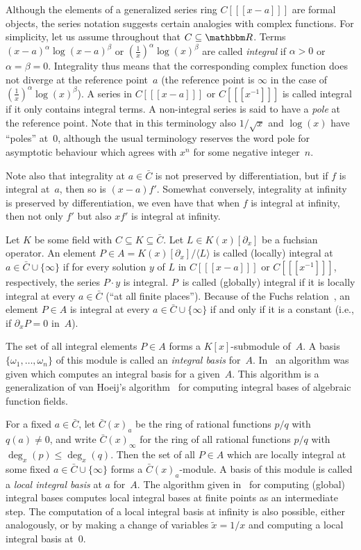 \documentclass{sig-alternate}
\def\<#1>{\langle#1\rangle}
\let\set\mathbbm
\begin{document}
Although the elements of a generalized series ring $C[[[x-a]]]$ are formal
objects, the series notation suggests certain analogies with complex
functions.  For simplicity, let us assume throughout that $C\subseteq\set
R$. Terms $(x-a)^\alpha\log(x-a)^\beta$ or $(\tfrac1x)^\alpha\log(x)^\beta$ are
called \emph{integral} if $\alpha>0$ or $\alpha=\beta=0$.
Integrality thus means that the corresponding complex
function does not diverge at the reference point~$a$ (the reference point is
$\infty$ in the case of $(\tfrac1x)^\alpha\log(x)^\beta$). A series in
$C[[[x-a]]]$ or $C[[[x^{-1}]]]$ is called integral if it only contains integral
terms. A non-integral series is said to have a \emph{pole} at the reference
point.  Note that in this terminology also $1/\sqrt{x}$ and $\log(x)$ have
``poles'' at~$0$, although the usual terminology reserves the word pole for
asymptotic behaviour which agrees with $x^n$ for some negative integer~$n$.

Note also that integrality at $a\in\bar C$ is not preserved by differentiation,
but if $f$ is integral at~$a$, then so is $(x-a)f'$. Somewhat conversely,
integrality at infinity is preserved by differentiation, we even have that
when $f$ is integral at infinity, then not only $f'$ but also $xf'$ is
integral at infinity. 

Let $K$ be some field with $C\subseteq K\subseteq\bar C$. 
Let $L\in K(x)[\partial_x]$ be a fuchsian operator. An element $P\in A=K(x)[\partial_x]/\<L>$
is called (locally) integral at $a\in\bar C\cup\{\infty\}$ if for every solution $y$
of $L$ in $C[[[x-a]]]$ or $C[[[x^{-1}]]]$, respectively, the series $P\cdot y$ is
integral. $P$~is called (globally) integral if it is locally integral at every
$a\in\bar C$ (``at all finite places''). Because of the Fuchs relation~\cite{ince26}, an
element $P\in A$ is integral at every $a\in\bar C\cup\{\infty\}$ if and only if it
is a constant (i.e., if $\partial_xP=0$ in~$A$).

The set of all integral elements $P\in A$ forms a $K[x]$-submodule of~$A$.
A basis $\{\omega_1,\dots,\omega_n\}$ of this module is called an \emph{integral basis}
for~$A$. In~\cite{kauers15b} an algorithm was given which computes an integral basis
for a given~$A$. This algorithm is a generalization of van Hoeij's
algorithm~\cite{vanHoeij94} for computing integral bases of algebraic function
fields.

For a fixed $a\in\bar C$, let $\bar C(x)_a$ be the ring of rational functions $p/q$
with $q(a)\neq0$, and write $\bar C(x)_\infty$ for the ring of all
rational functions $p/q$ with $\deg_x(p)\leq\deg_x(q)$.
Then the set of all $P\in A$ which are locally integral at some
fixed $a\in\bar C\cup\{\infty\}$ forms a $\bar C(x)_a$-module. A basis of this module is
called a \emph{local integral basis} at $a$ for~$A$. The algorithm given in~\cite{kauers15b}
for computing (global) integral bases computes local integral bases at finite
points as an intermediate step. The computation of a local integral basis at
infinity is also possible, either analogously, or by making a change of
variables $\tilde x=1/x$ and computing a local integral basis at~$0$.
\end{document}
